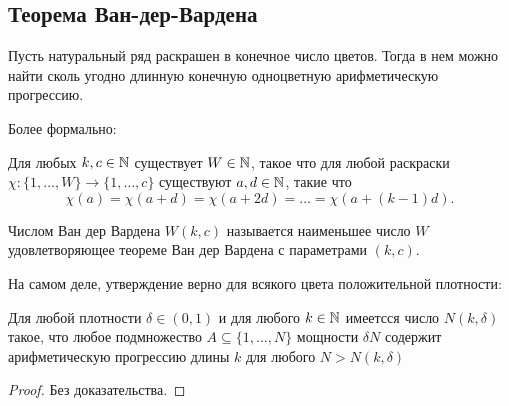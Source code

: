 \begin{normalsize}

\subsection{Теорема Ван-дер-Вардена}

\begin{theorem} 
    Пусть натуральный ряд раскрашен в конечное число цветов. Тогда в нем можно найти сколь угодно длинную конечную одноцветную арифметическую прогрессию.

    Более формально:

    Для любых $k, c \in \mathbb{N}$ существует $W \in \mathbb{N}$, такое что для любой раскраски $\chi: \{1, \ldots, W\} \to \{1, \ldots, c\}$ существуют $a,d \in \mathbb{N}$, такие что 
    \[ \chi(a) = \chi(a + d) = \chi(a + 2d) = \ldots = \chi(a + (k - 1)d). \]
\end{theorem}

\begin{defn}
    Числом Ван дер Вардена $W(k, c)$ называется наименьшее число $W$ удовлетворяющее теореме Ван дер Вардена с параметрами $(k, c)$.
\end{defn}

На самом деле, утверждение верно для всякого цвета положительной плотности:

\begin{theorem} [Семереди]
    Для любой плотности $\delta \in (0, 1)$ и для любого $k \in \mathbb{N}$ имеетсся число $N(k, \delta)$ такое, что любое подмножество $A \subseteq \{1, \ldots, N\}$ мощности $\delta N$ содержит арифметическую прогрессию длины $k$ для любого $N > N(k, \delta)$
\end{theorem}

\begin{proof}
    Без доказательства.
\end{proof}

\end{normalsize}